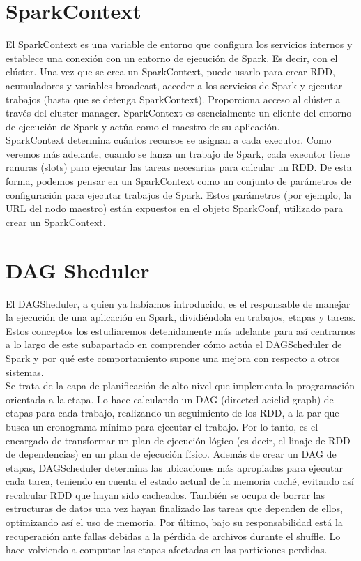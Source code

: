  
\section{SparkContext}
 
El SparkContext es una variable de entorno que configura los servicios internos y establece una conexión con un entorno de ejecución de Spark. Es decir, con el clúster.
Una vez que se crea un SparkContext, puede usarlo para crear RDD, acumuladores y variables broadcast, acceder a los servicios de Spark y ejecutar trabajos (hasta que se detenga SparkContext). Proporciona acceso al clúster a través del cluster manager.
SparkContext es esencialmente un cliente del entorno de ejecución de Spark y actúa como el maestro de su aplicación.\\

SparkContext determina cuántos recursos se asignan a cada executor. Como veremos más adelante, cuando se lanza un trabajo de Spark, cada executor tiene ranuras (slots) para ejecutar las tareas necesarias para calcular un RDD. De esta forma, podemos pensar en un SparkContext como un conjunto de parámetros de configuración para ejecutar trabajos de Spark. Estos parámetros (por ejemplo, la URL del nodo maestro) están expuestos en el objeto SparkConf, utilizado para crear un SparkContext.\\
 
\section{DAG Sheduler}
 
El DAGSheduler, a quien ya habíamos introducido, es el responsable de manejar la ejecución de una aplicación en Spark, dividiéndola en trabajos, etapas y tareas. Estos conceptos los estudiaremos detenidamente más adelante para así centrarnos a lo largo de este subapartado en comprender cómo actúa el DAGScheduler de Spark y por qué este comportamiento supone una mejora con respecto a otros sistemas.\\

Se trata de la capa de planificación de alto nivel \cite{05GitDAG} que implementa la programación orientada a la etapa. Lo hace calculando un DAG (directed aciclid graph) de etapas para cada trabajo, realizando un seguimiento de los RDD, a la par que busca un cronograma mínimo para ejecutar el trabajo. Por lo tanto, es el encargado de transformar un plan de ejecución lógico (es decir, el linaje de RDD de dependencias) en un plan de ejecución físico. Además de crear un DAG de etapas, DAGScheduler determina las ubicaciones más apropiadas para ejecutar cada tarea, teniendo en cuenta el estado actual de la memoria caché, evitando así recalcular RDD que hayan sido cacheados. También se ocupa de borrar las estructuras de datos una vez hayan finalizado las tareas que dependen de ellos, optimizando así el uso de memoria. Por último, bajo su responsabilidad está la recuperación ante fallas debidas a la pérdida de archivos durante el shuffle. Lo hace volviendo a computar las etapas afectadas en las particiones perdidas.\\

